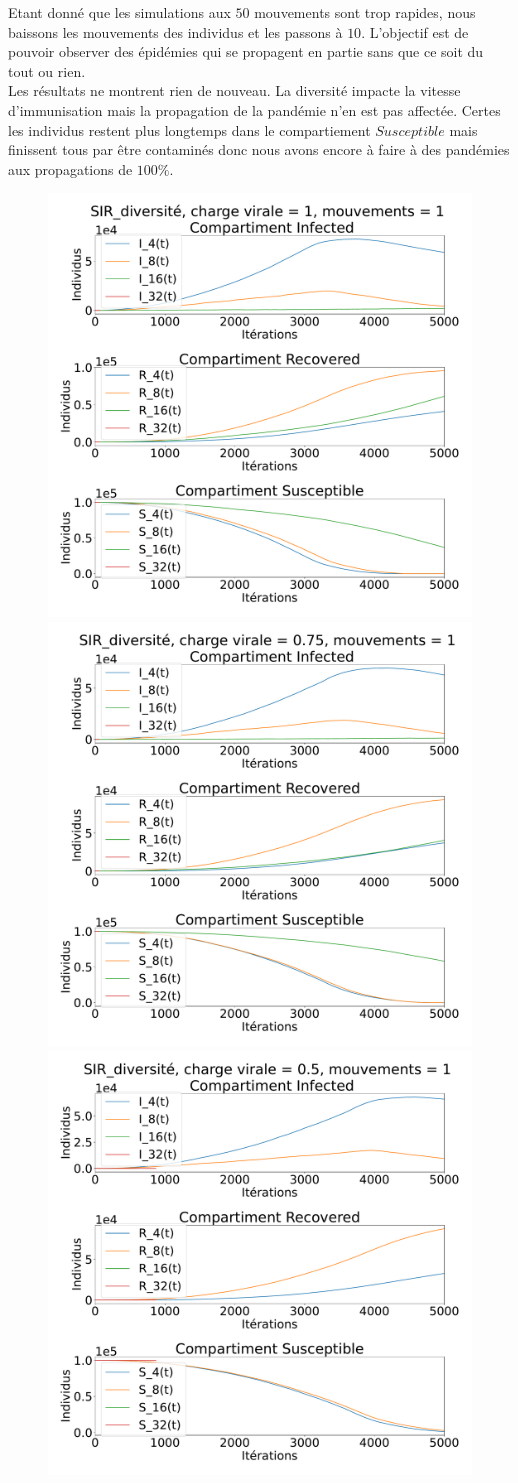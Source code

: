 Etant donné que les simulations aux $50$ mouvements sont trop rapides, nous baissons les mouvements des individus et les passons à $10$. L'objectif est de pouvoir observer des épidémies qui se propagent en partie sans que ce soit du tout ou rien.\\

Les résultats ne montrent rien de nouveau. La diversité impacte la vitesse d'immunisation mais la propagation de la pandémie n'en est pas affectée. Certes les individus restent plus longtemps dans le compartiement $Susceptible$ mais finissent tous par être contaminés donc nous avons encore à faire à des pandémies aux propagations de $100\%$.

\newpage

\begin{figure}[h]
	\centering
	\captionsetup{justification=centering}
	\includegraphics[width=.4\textwidth]{Images/SIR_diversite_1_1.pdf}
	\includegraphics[width=.4\textwidth]{Images/SIR_diversite_075_1.pdf}
	\includegraphics[width=.4\textwidth]{Images/SIR_diversite_05_1.pdf}

\end{figure}
